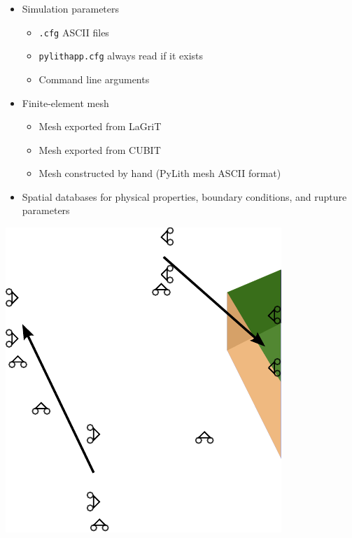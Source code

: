 \documentclass[pdftex,cig,slideColor]{pp4slides}
\begin{document}
  \begin{itemize}
  \item Simulation parameters
    \begin{itemize}
    \item {\tt .cfg} ASCII files
    \item {\tt pylithapp.cfg} always read if it exists
    \item Command line arguments
    \end{itemize}
  \item Finite-element mesh
    \begin{itemize}
    \item Mesh exported from LaGriT
    \item Mesh exported from CUBIT
    \item Mesh constructed by hand (PyLith mesh ASCII format)
    \end{itemize}
  \item Spatial databases for physical properties, boundary
    conditions, and rupture parameters
  \end{itemize}


  \vfill
  \begin{center}
    \includegraphics[scale=1.0]{figs/step01_diagram}
  \end{center}
  \vfill
\end{document}
